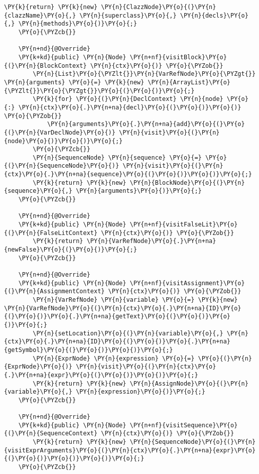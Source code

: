\begin{Verbatim}[commandchars=\\\{\}]
        \PY{k}{return} \PY{k}{new} \PY{n}{ClazzNode}\PY{o}{(}\PY{n}{clazzName}\PY{o}{,} \PY{n}{superclass}\PY{o}{,} \PY{n}{decls}\PY{o}{,} \PY{n}{methods}\PY{o}{)}\PY{o}{;}
    \PY{o}{\PYZcb{}}

    \PY{n+nd}{@Override}
    \PY{k+kd}{public} \PY{n}{Node} \PY{n+nf}{visitBlock}\PY{o}{(}\PY{n}{BlockContext} \PY{n}{ctx}\PY{o}{)} \PY{o}{\PYZob{}}
        \PY{n}{List}\PY{o}{\PYZlt{}}\PY{n}{VarRefNode}\PY{o}{\PYZgt{}} \PY{n}{arguments} \PY{o}{=} \PY{k}{new} \PY{n}{ArrayList}\PY{o}{\PYZlt{}}\PY{o}{\PYZgt{}}\PY{o}{(}\PY{o}{)}\PY{o}{;}
        \PY{k}{for} \PY{o}{(}\PY{n}{DeclContext} \PY{n}{node} \PY{o}{:} \PY{n}{ctx}\PY{o}{.}\PY{n+na}{decl}\PY{o}{(}\PY{o}{)}\PY{o}{)} \PY{o}{\PYZob{}}
            \PY{n}{arguments}\PY{o}{.}\PY{n+na}{add}\PY{o}{(}\PY{o}{(}\PY{n}{VarDeclNode}\PY{o}{)} \PY{n}{visit}\PY{o}{(}\PY{n}{node}\PY{o}{)}\PY{o}{)}\PY{o}{;}
        \PY{o}{\PYZcb{}}
        \PY{n}{SequenceNode} \PY{n}{sequence} \PY{o}{=} \PY{o}{(}\PY{n}{SequenceNode}\PY{o}{)} \PY{n}{visit}\PY{o}{(}\PY{n}{ctx}\PY{o}{.}\PY{n+na}{sequence}\PY{o}{(}\PY{o}{)}\PY{o}{)}\PY{o}{;}
        \PY{k}{return} \PY{k}{new} \PY{n}{BlockNode}\PY{o}{(}\PY{n}{sequence}\PY{o}{,} \PY{n}{arguments}\PY{o}{)}\PY{o}{;}
    \PY{o}{\PYZcb{}}

    \PY{n+nd}{@Override}
    \PY{k+kd}{public} \PY{n}{Node} \PY{n+nf}{visitFalseLit}\PY{o}{(}\PY{n}{FalseLitContext} \PY{n}{ctx}\PY{o}{)} \PY{o}{\PYZob{}}
        \PY{k}{return} \PY{n}{VarRefNode}\PY{o}{.}\PY{n+na}{newFalse}\PY{o}{(}\PY{o}{)}\PY{o}{;}
    \PY{o}{\PYZcb{}}

    \PY{n+nd}{@Override}
    \PY{k+kd}{public} \PY{n}{Node} \PY{n+nf}{visitAssignment}\PY{o}{(}\PY{n}{AssignmentContext} \PY{n}{ctx}\PY{o}{)} \PY{o}{\PYZob{}}
        \PY{n}{VarRefNode} \PY{n}{variable} \PY{o}{=} \PY{k}{new} \PY{n}{VarRefNode}\PY{o}{(}\PY{n}{ctx}\PY{o}{.}\PY{n+na}{ID}\PY{o}{(}\PY{o}{)}\PY{o}{.}\PY{n+na}{getText}\PY{o}{(}\PY{o}{)}\PY{o}{)}\PY{o}{;}
        \PY{n}{setLocation}\PY{o}{(}\PY{n}{variable}\PY{o}{,} \PY{n}{ctx}\PY{o}{.}\PY{n+na}{ID}\PY{o}{(}\PY{o}{)}\PY{o}{.}\PY{n+na}{getSymbol}\PY{o}{(}\PY{o}{)}\PY{o}{)}\PY{o}{;}
        \PY{n}{ExprNode} \PY{n}{expression} \PY{o}{=} \PY{o}{(}\PY{n}{ExprNode}\PY{o}{)} \PY{n}{visit}\PY{o}{(}\PY{n}{ctx}\PY{o}{.}\PY{n+na}{expr}\PY{o}{(}\PY{o}{)}\PY{o}{)}\PY{o}{;}
        \PY{k}{return} \PY{k}{new} \PY{n}{AssignNode}\PY{o}{(}\PY{n}{variable}\PY{o}{,} \PY{n}{expression}\PY{o}{)}\PY{o}{;}
    \PY{o}{\PYZcb{}}

    \PY{n+nd}{@Override}
    \PY{k+kd}{public} \PY{n}{Node} \PY{n+nf}{visitSequence}\PY{o}{(}\PY{n}{SequenceContext} \PY{n}{ctx}\PY{o}{)} \PY{o}{\PYZob{}}
        \PY{k}{return} \PY{k}{new} \PY{n}{SequenceNode}\PY{o}{(}\PY{n}{visitExprArguments}\PY{o}{(}\PY{n}{ctx}\PY{o}{.}\PY{n+na}{expr}\PY{o}{(}\PY{o}{)}\PY{o}{)}\PY{o}{)}\PY{o}{;}
    \PY{o}{\PYZcb{}}


\end{Verbatim}

